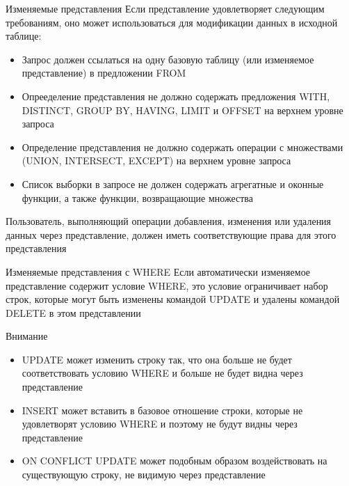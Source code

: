 \documentclass[12pt]{article}
\begin{document}
\begin{defin}{Изменяемые представления}
    Если представление удовлетворяет следующим требованиям, оно может использоваться для модификации данных в исходной таблице: 

    \begin{itemize}
        \item Запрос должен ссылаться на одну базовую таблицу (или изменяемое представление) в предложении FROM 
        \item Опрееделение представления не должно содержать предложения WITH, DISTINCT, GROUP BY, HAVING, LIMIT и OFFSET на верхнем уровне запроса 
        \item Определение представления не должно содержать операции с множествами (UNION, INTERSECT, EXCEPT) на верхнем уровне запроса
        \item Список выборки в запросе не должен содержать агрегатные и оконные функции, а также функции, возвращающие множества 
    \end{itemize}

    Пользователь, выполняющий операции добавления, изменения или удаления данных через представление, должен иметь соответствующие права для этого представления 
\end{defin}

\begin{defin}{Изменяемые представления с WHERE}
    Если автоматически изменяемое представление содержит условие WHERE, это условие ограничивает набор строк, которые могут быть изменены командой UPDATE и удалены командой DELETE в этом представлении 
\end{defin}

\begin{Remark}{Внимание}
    \begin{itemize}
        \item UPDATE может изменить строку так, что она больше не будет соответствовать условию WHERE и больше не будет видна через представление 
        \item INSERT может вставить в базовое отношение строки, которые не удовлетворят условию WHERE и поэтому не будут видны через представление  
        \item ON CONFLICT UPDATE может подобным образом воздействовать на существующую строку, не видимую через представление 
    \end{itemize}
\end{Remark}
\end{document}
